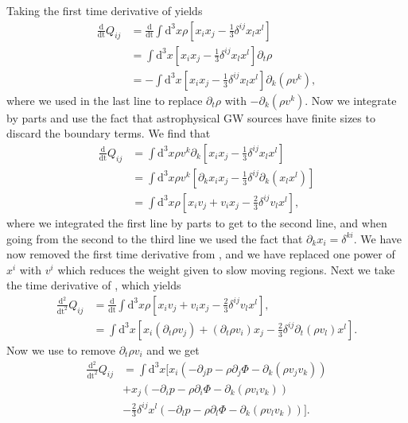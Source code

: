 Taking the first time derivative of  yields
\begin{align} \label{eqT:quaddt}
\frac{\mathrm{d}}{\mathrm{dt}}Q_{ij} &=  \frac{\mathrm{d}}{\mathrm{dt}} 
\int \mathrm{d}^3 x \rho\left [x_i x_j - \frac{1}{3} \delta^{ij} x_l x^l \right ] \nonumber \\ 
& = \int \mathrm{d}^3 x \left [x_i x_j - \frac{1}{3} \delta^{ij} x_l x^l \right ] \partial_t \rho \nonumber \\
& = -\int \mathrm{d}^3 x \left [x_i x_j - \frac{1}{3} \delta^{ij} x_l x^l \right ] \partial_k (\rho v^k),
\end{align}
where we used  in the last line to replace $\partial_t \rho$ with $-\partial_k (\rho v^k)$.
Now we integrate  by parts and use the fact that astrophysical GW sources have finite sizes 
to discard the boundary terms. We find that
\begin{align} \label{eqT:quaddt2}
\frac{\mathrm{d}}{\mathrm{dt}}Q_{ij} &= \int \mathrm{d}^3 x \rho  v^k \partial_k \left [x_i x_j - \frac{1}{3} \delta^{ij} x_l x^l \right ] \nonumber \\
&= \int \mathrm{d}^3 x \rho v^k \left  [\partial_k x_i x_j - \frac{1}{3} \delta^{ij} \partial_k (x_l x^l) \right ] \nonumber \\
&= \int \mathrm{d}^3 x \rho \left [x_i v_j + v_i x_j - \frac{2}{3} \delta^{ij} v_l x^l \right ],
\end{align}
where we integrated the first line by parts to get to the second line, and when going from the second to the third line we used the fact that
$\partial_k x_i = \delta^{ki}$. We have now removed the first time derivative from , and we have replaced one
power of $x^i$ with $v^i$ which reduces the weight given to slow moving regions.
Next we take the time derivative of , which yields
\begin{align} \label{eqT:quaddtt}
\frac{\mathrm{d}^2}{\mathrm{dt}^2}Q_{ij} &= \frac{\mathrm{d}}{\mathrm{dt}} \int \mathrm{d}^3 x \rho \left  
[x_i v_j + v_i x_j - \frac{2}{3} \delta^{ij} v_l x^l \right ], \nonumber \\
& = \int \mathrm{d}^3 x \left [x_i (\partial_t \rho v_j) +  (\partial_t \rho v_i) x_j - \frac{2}{3} \delta^{ij} \partial_t ( \rho v_l) x^l \right ].
\end{align}
Now we use  to remove $\partial_t \rho v_i$ and we get
\begin{align} \label{eqT:quaddtt2}
\frac{\mathrm{d}^2}{\mathrm{dt}^2} Q_{ij} & = \int \mathrm{d}^3 x \bigg[ x_i (-\partial_j p - \rho \partial_j \Phi - \partial_k (\rho v_j v_k)) \nonumber \\
&+ x_j (-\partial_i p - \rho \partial_i \Phi - \partial_k (\rho v_i v_k)) \nonumber \\
&- \frac{2}{3} \delta^{ij} x^l (-\partial_l p - \rho \partial_l \Phi - \partial_k (\rho v_l v_k)) \bigg].
\end{align}
